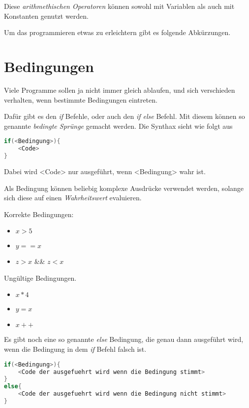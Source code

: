 \documentclass[c_worksheet.tex]{subfiles}
\begin{document}
 Diese \emph{arithmethischen Operatoren} können sowohl mit Variablen als auch mit Konstanten genutzt werden.

  

Um das programmieren etwas zu erleichtern gibt es folgende Abkürzungen.

 



\section{Bedingungen}

Viele Programme sollen ja nicht immer gleich ablaufen, und sich verschieden verhalten, wenn bestimmte Bedingungen eintreten.

Dafür gibt es den \emph{if} Befehle, oder auch den \emph{if else} Befehl. Mit diesem können so genannte \emph{bedingte Sprünge} gemacht werden. Die Synthax sieht wie folgt aus

\begin{lstlisting}[language=c]
if(<Bedingung>){
	<Code>
}
\end{lstlisting}

Dabei wird <Code> nur ausgeführt, wenn <Bedingung> wahr ist.

Als Bedingung können beliebig komplexe Ausdrücke verwendet werden, solange sich diese auf einen \emph{Wahrheitswert} evaluieren.

Korrekte Bedingungen:

\begin{itemize}
	\item \(x > 5\)
	\item \(y == x\)
	\item \(z > x\) \&\& \(z < x\)
\end{itemize}

Ungültige Bedingungen.

\begin{itemize}
	\item \(x * 4\)
	\item \(y = x\)
	\item \(x++\)
\end{itemize}

Es gibt noch eine so genannte \emph{else} Bedingung, die genau dann ausgeführt wird, wenn die Bedingung in dem \emph{if} Befehl falsch ist.

\begin{lstlisting}[language=c]
if(<Bedingung>){
	<Code der ausgefuehrt wird wenn die Bedingung stimmt>
}
else{
	<Code der ausgefuehrt wird wenn die Bedingung nicht stimmt>
}
\end{lstlisting}
\end{document}
